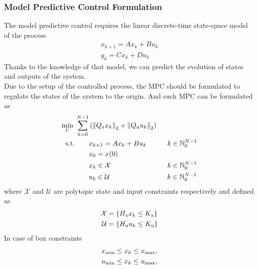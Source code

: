 \subsubsection{Model Predictive Control Formulation}
The model predictive control requires the linear discrete-time state-space model of the process
\begin{subequations}\label{linmodel}
	\begin{align}	
	x_{k+1} = Ax_k + Bu_k\\
	y_k = Cx_k + Du_k
	\end{align}
\end{subequations}
Thanks to the knowledge of that model, we can predict the evolution of states and outputs of the system.\\
Due to the setup of the controlled process, the MPC should be formulated to regulate the states of the system to the origin. And such MPC can be formulated as
\begin{subequations}\label{mpcgeneral}
	\begin{align}
		\min_{U}\ \sum_{k=0}^{N-1}& \left( \left\| Q _{\text{x}}x_{k}\right\|_2+\left\|Q _{\text{u}}u_{k}\right\|_2 \right)\\
	    \label{eq217b}\text{s.t.}\qquad&x_{k+1} = Ax_{k} + Bu_{k}\qquad\quad  k \in \mathbb{N}_0^{N-1}\\
		&x_0 = x(0)\\
		\label{cst_x}&x_{k}\in\mathcal{X}\qquad\qquad\qquad\qquad\,  k \in \mathbb{N}_0^{N-1}\\
		\label{cst_u}&u_{k}\in\mathcal{U}\qquad\qquad\qquad\qquad\;   k \in \mathbb{N}_0^{N-1}
	\end{align}
\end{subequations}
where $\mathcal{X}$ and $\mathcal{U}$ are polytopic state and input constraints respectively and defined as
\begin{subequations}
	\begin{align}
	\mathcal{X} &= \{H _{\text{x}}x_k\leq K _{\text{x}}\}\\
	\mathcal{U} &= \{H _{\text{u}}u_k\leq K _{\text{u}}\}
	\end{align}
\end{subequations}
In case of box constraints
\begin{subequations}
	\begin{align}
		x _{\text{min}}\leq x_k \leq x _{\text{max}},\\
		u _{\text{min}}\leq x_k \leq u _{\text{max}},\\
	\end{align}
\end{subequations}
